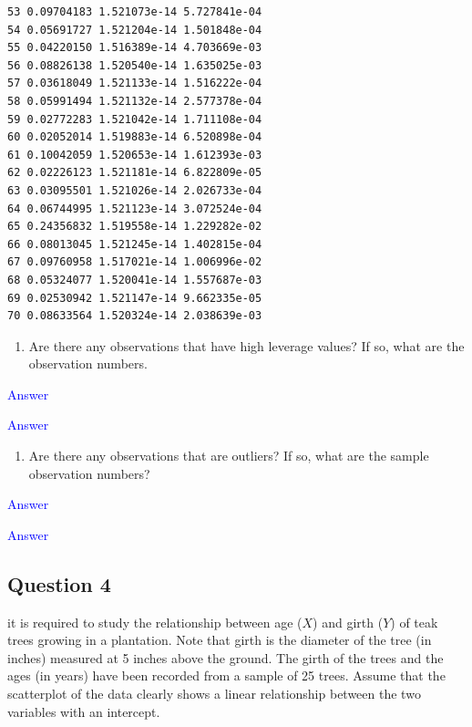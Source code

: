 \documentclass[]{article}
\providecommand{\tightlist}{%
  \setlength{\itemsep}{0pt}\setlength{\parskip}{0pt}}
\begin{document}
\begin{verbatim}
53 0.09704183 1.521073e-14 5.727841e-04
54 0.05691727 1.521204e-14 1.501848e-04
55 0.04220150 1.516389e-14 4.703669e-03
56 0.08826138 1.520540e-14 1.635025e-03
57 0.03618049 1.521133e-14 1.516222e-04
58 0.05991494 1.521132e-14 2.577378e-04
59 0.02772283 1.521042e-14 1.711108e-04
60 0.02052014 1.519883e-14 6.520898e-04
61 0.10042059 1.520653e-14 1.612393e-03
62 0.02226123 1.521181e-14 6.822809e-05
63 0.03095501 1.521026e-14 2.026733e-04
64 0.06744995 1.521123e-14 3.072524e-04
65 0.24356832 1.519558e-14 1.229282e-02
66 0.08013045 1.521245e-14 1.402815e-04
67 0.09760958 1.517021e-14 1.006996e-02
68 0.05324077 1.520041e-14 1.557687e-03
69 0.02530942 1.521147e-14 9.662335e-05
70 0.08633564 1.520324e-14 2.038639e-03
\end{verbatim}

\begin{enumerate}
\def\labelenumi{\roman{enumi})}
\setcounter{enumi}{2}
\tightlist
\item
  Are there any observations that have high leverage values? If so, what
  are the observation numbers.
\end{enumerate}

\textcolor{blue}{Answer}

\newpage

\textcolor{blue}{Answer}

\newpage

\begin{enumerate}
\def\labelenumi{\roman{enumi})}
\setcounter{enumi}{3}
\tightlist
\item
  Are there any observations that are outliers? If so, what are the
  sample observation numbers?
\end{enumerate}

\textcolor{blue}{Answer}

\newpage

\textcolor{blue}{Answer}

\newpage

\hypertarget{question-4}{%
\subsection{Question 4}\label{question-4}}

it is required to study the relationship between age (\(X\)) and girth
(\(Y\)) of teak trees growing in a plantation. Note that girth is the
diameter of the tree (in inches) measured at 5 inches above the ground.
The girth of the trees and the ages (in years) have been recorded from a
sample of 25 trees. Assume that the scatterplot of the data clearly
shows a linear relationship between the two variables with an intercept.
\end{document}
